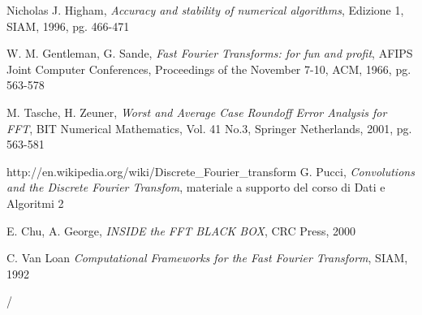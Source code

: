 \begin{thebibliography}{99}
 Nicholas J. Higham, \emph{Accuracy and stability of numerical algorithms}, Edizione 1, SIAM, 1996, pg. 466-471

 W. M. Gentleman, G. Sande, \emph{Fast Fourier Transforms: for fun and profit}, AFIPS Joint Computer Conferences, Proceedings of the November 7-10, ACM, 1966, pg. 563-578

M. Tasche, H. Zeuner, \emph{Worst and Average Case Roundoff Error Analysis for FFT}, BIT Numerical Mathematics, Vol. 41 No.3, Springer Netherlands, 2001, pg. 563-581

 http://en.wikipedia.org/wiki/Discrete\_Fourier\_transform
G. Pucci, \emph{Convolutions and the Discrete Fourier Transfom}, materiale a supporto del corso di Dati e Algoritmi 2

 E. Chu, A. George, \emph{INSIDE the FFT BLACK BOX}, CRC Press, 2000

 C. Van Loan \emph{Computational Frameworks for the Fast Fourier Transform}, SIAM, 1992





\end{thebibliography}

 / 